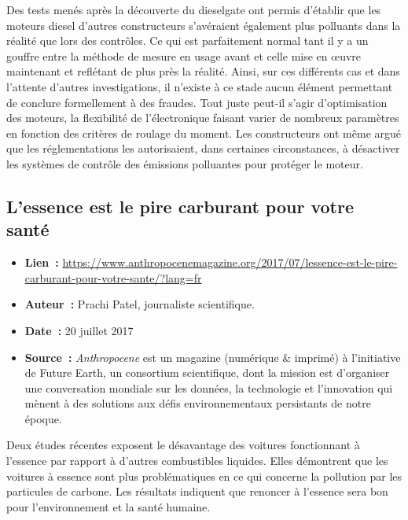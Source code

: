 \documentclass[8pt]{article}
\begin{document}
Des tests menés après la découverte du dieselgate ont permis d'établir que les moteurs diesel d'autres constructeurs s'avéraient également plus polluants dans la réalité que lors des contrôles. Ce qui est parfaitement normal tant il y a un gouffre entre la méthode de mesure en usage avant et celle mise en œuvre maintenant et reflétant de plus près la réalité.
Ainsi, sur ces différents cas et dans l'attente d'autres investigations, il n'existe à ce stade aucun élément permettant de conclure formellement à des fraudes. Tout juste peut-il s'agir d'optimisation des moteurs, la flexibilité de l'électronique faisant varier de nombreux paramètres en fonction des critères de roulage du moment. Les constructeurs ont même argué que les réglementations les autorisaient, dans certaines circonstances, à désactiver les systèmes de contrôle des émissions polluantes pour protéger le moteur. 

\newpage
\subsection{L’essence est le pire carburant pour votre santé}
\label{debat:essencepire}

\begin{itemize}
	\item \textbf{Lien~: } \url{https://www.anthropocenemagazine.org/2017/07/lessence-est-le-pire-carburant-pour-votre-sante/?lang=fr} 
	\item \textbf{Auteur~: } Prachi Patel, journaliste scientifique.
	\item \textbf{Date~: } 20 juillet 2017
	\item \textbf{Source~: } \textit{Anthropocene} est un magazine (numérique \& imprimé) à l'initiative de Future Earth, un consortium scientifique, dont la mission est d'organiser une conversation mondiale sur les données, la technologie et l'innovation qui mènent à des solutions aux défis environnementaux persistants de notre époque.
\end{itemize}

Deux études récentes exposent le désavantage des voitures fonctionnant à l’essence par rapport à d’autres combustibles liquides. Elles démontrent que les voitures à essence sont plus problématiques en ce qui concerne la pollution par les particules de carbone. Les résultats indiquent que renoncer à l’essence sera bon pour l’environnement et la santé humaine.\\
\end{document}

